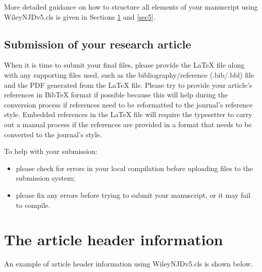 \documentclass[11pt]{article}
\begin{document}
More detailed guidance on how to structure all elements of your manuscript using WileyNJDv5.cls is given in Sections \ref{sec4a} and \ref{sec5}.


\subsection{Submission of your research article}

When it is time to submit your f{i}nal f{i}les, please provide the LaTeX f{i}le along with any supporting f{i}les used,
such as the bibliography/reference (.bib/.bbl) f{i}le and the PDF generated from the LaTeX f{i}le.
Please try to provide your article’s references in BibTeX format if possible because this will help during the conversion process if references
need to be reformatted to the journal’s reference style.  Embedded references in the LaTeX f{i}le will require the typesetter to carry out a manual
process if the references are provided in a format that needs to be converted to the journal’s style.


To help with your submission:
\begin{itemize}
\item please check for errors in your local compilation before uploading f{i}les to the submission system;
\item please f{i}x any errors before trying to submit your manuscript, or it may fail to compile.
\end{itemize}

\section{The article header information}
\label{sec4a}

An example of article header information using WileyNJDv5.cls is shown below.
\end{document}

